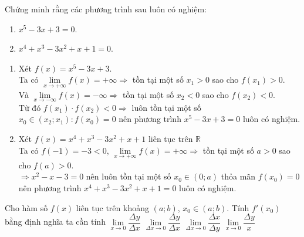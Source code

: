 \begin{bt}%
	Chứng minh rằng các phương trình sau luôn có nghiệm:
	\begin{enumerate}
		\item $x^5-3 x+3=0$.
		\item $x^4+x^3-3 x^2+x+1=0$.
	\end{enumerate}
	\loigiai
	{\begin{enumerate}
			\item Xét $f(x)=x^5-3 x+3$.\\
			Ta có
			$\lim\limits_{x \rightarrow+\infty} f(x)=+\infty \Rightarrow$ tồn tại một số $x_1>0$ sao cho $f\left(x_1\right)>0$.\\
			Và $\lim\limits_{x \rightarrow-\infty} f(x)=-\infty \Rightarrow$ tồn tại một số $x_2<0$ sao cho $f\left(x_2\right)<0$.\\
			Từ đó $f\left(x_1\right) \cdot f\left(x_2\right)<0 \Rightarrow$ luôn tồn tại một số $x_0 \in\left(x_2 ; x_1\right): f\left(x_0\right)=0$ nên phương trình $x^5-3 x+3=0$ luôn có nghiệm.
			\item Xét $f(x)=x^4+x^3-3 x^2+x+1$ liên tục trên $\mathbb{R}$\\
			Ta có $f(-1)=-3<0$,
			$\lim\limits_{x \rightarrow+\infty} f(x)=+\infty \Rightarrow$ tồn tại một số $a>0$ sao cho $f(a)>0$.\\
			$\Rightarrow x^2-x-3=0$ nên luôn tồn tại một số $x_0 \in(0 ; a)$ thỏa mãn $f\left(x_0\right)=0$ nên phương trình $x^4+x^3-3 x^2+x+1=0$ luôn có nghiệm.	
		\end{enumerate}
	}
\end{bt}

\begin{ex}%
	Cho hàm số $ f\left( x \right)  $ liên tục trên khoảng $ (a;b) $, $ x_0 \in (a;b) $. Tính $ f'\left( x_0 \right) $ bằng định nghĩa ta cần tính
	 \choice
		 {$ \mathop {\lim }\limits_{x \to 0} \dfrac{{\Delta y}}{{\Delta x}} $}
		 {\True $ \mathop {\lim }\limits_{\Delta x \to 0} \dfrac{{\Delta y}}{{\Delta x}} $}
		{$ \mathop {\lim }\limits_{\Delta x \to 0}  \dfrac{{\Delta x}}{{\Delta y}} $}
		{$ \mathop {\lim }\limits_{x \to 0}  \dfrac{{\Delta y}}{{x}} $}
\end{ex}

